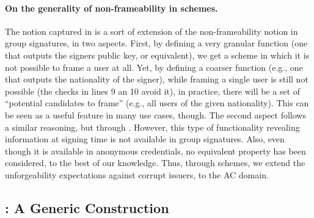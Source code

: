 \paragraph{On the generality of non-frameability in \UAS schemes.} %
The notion captured in \UAS is a sort of extension of the non-frameability
notion in group signatures, in two aspects. First, by defining a very granular
\finsp function (one that outputs the signers public key, or equivalent),
we get a scheme in which it is not possible to frame a user at all. Yet, by
defining a coarser \finsp function (e.g., one that outputs the nationality of
the signer), while framing a single user is still not possible (the checks in
lines 9 an 10 avoid it), in practice, there will be a set of ``potential
candidates to frame'' (e.g., all users of the given nationality). This can be
seen as a useful feature in many use cases, though.
%
The second aspect follows a similar reasoning, but through \feval. However, this
type of functionality revealing information at signing time is not available in
group signatures. Also, even though it is available in anonymous credentials, no
equivalent property has been considered, to the best of our knowledge. Thus,
through \UAS schemes, we extend the unforgeability expectations against corrupt
issuers, to the AC domain.


\subsection{\CUASGen: A Generic \UAS Construction}
\label{ssec:generic-construction-uas}

